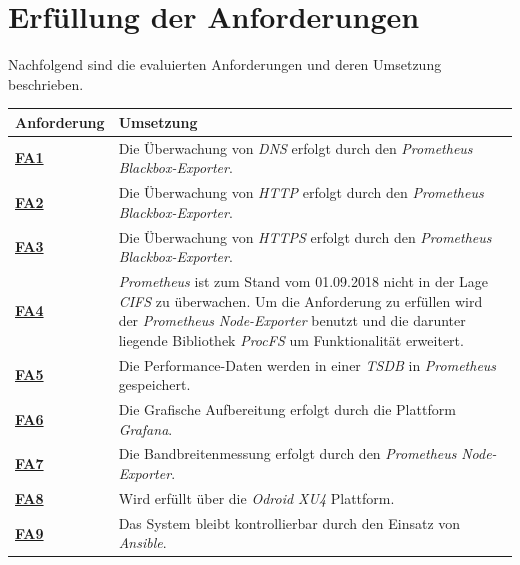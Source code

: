 \documentclass[titlepage]{report}
\begin{document}
\section*{Erfüllung der Anforderungen}
Nachfolgend sind die evaluierten Anforderungen und deren Umsetzung
beschrieben.
\tabulinesep=1.2mm
\begin{center}
    \begin{tabu}{X[-1] X}
\toprule
\textbf{Anforderung} & \textbf{Umsetzung}  \\
\midrule
        \hyperref[table:FA1]{\textbf{FA1}} & Die Überwachung von \emph{DNS} erfolgt durch den \emph{Prometheus} \emph{Blackbox-Exporter}. \\
        \hyperref[table:FA2]{\textbf{FA2}} & Die Überwachung von \emph{HTTP} erfolgt durch den \emph{Prometheus} \emph{Blackbox-Exporter}. \\
        \hyperref[table:FA3]{\textbf{FA3}} & Die Überwachung von \emph{HTTPS} erfolgt durch den \emph{Prometheus} \emph{Blackbox-Exporter}. \\
        \hyperref[table:FA4]{\textbf{FA4}} & \emph{Prometheus} ist zum Stand vom 01.09.2018 nicht in der Lage \emph{CIFS} zu überwachen. Um die Anforderung zu erfüllen wird der \emph{Prometheus} \emph{Node-Exporter} benutzt und die darunter liegende Bibliothek \emph{ProcFS} um Funktionalität erweitert. \\
        \hyperref[table:FA5]{\textbf{FA5}} & Die Performance-Daten werden in einer \emph{TSDB} in \emph{Prometheus} gespeichert. \\
        \hyperref[table:FA6]{\textbf{FA6}} & Die Grafische Aufbereitung erfolgt durch die Plattform \emph{Grafana}. \\
        \hyperref[table:FA7]{\textbf{FA7}} & Die Bandbreitenmessung erfolgt durch den \emph{Prometheus} \emph{Node-Exporter}. \\
        \hyperref[table:FA8]{\textbf{FA8}} & Wird erfüllt über die \emph{Odroid XU4} Plattform. \\
        \hyperref[table:FA9]{\textbf{FA9}} & Das System bleibt kontrollierbar durch den Einsatz von \emph{Ansible}. \\
\bottomrule
    \end{tabu}
    \label{table:mapping1}
\end{center}
\tabulinesep=1.2mm
\end{document}
